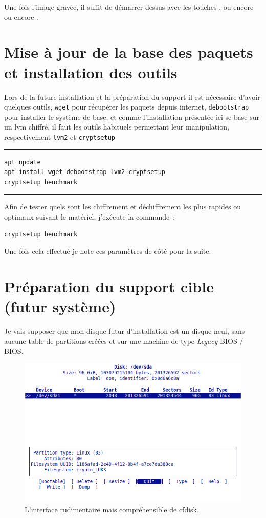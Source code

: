 \documentclass[12pt, a4paper]{report}
\begin{document}
Une fois l'image gravée, il suffit de démarrer dessus avec les touches ,  ou encore  ou encore .

\section{Mise à jour de la base des paquets et installation des outils}

Lors de la future installation et la préparation du support il est nécessaire d'avoir quelques outils, \texttt{wget} pour récupérer les paquets depuis internet, \texttt{debootstrap} pour installer le système de base, et comme l'installation présentée ici se base sur un lvm chiffré, il faut les outils habituels permettant leur manipulation, respectivement \texttt{lvm2} et \texttt{cryptsetup} 

\noindent \rule{\linewidth}{0.5pt}
\begin{verbatim}
apt update
apt install wget debootstrap lvm2 cryptsetup
cryptsetup benchmark
\end{verbatim}
\rule{\linewidth}{0.5pt}

Afin de tester quels sont les chiffrement et déchiffrement les plus rapides ou optimaux suivant le matériel, j'exécute la commande~:\newline
\begin{verbatim}
cryptsetup benchmark
\end{verbatim}

Une fois cela effectué je note ces paramètres de côté pour la suite.

\section{Préparation du support cible (futur système)}
Je vais supposer que mon disque futur d'installation est un disque neuf, sans aucune table de partitions créées et sur une machine de type \emph{Legacy} BIOS / BIOS.

\begin{figure}
	\centering
	\includegraphics{cfdisk.png}
	\caption{L'interface rudimentaire mais compréhensible de cfdisk.}
\end{figure}
\end{document}

